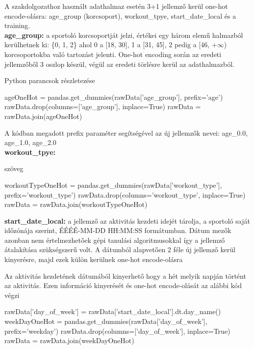 A szakdolgozathoz használt adathalmaz esetén 3+1 jellemző kerül one-hot encode-olásra: age\_group (korcsoport), workout\_tpye, start\_date\_local és a training.\\[6pt]

\textbf{age\_group:} a sportoló korcsoportját jelzi, értékei egy három elemű halmazból kerülhetnek ki: \{0, 1, 2\} ahol 0 a [18, 30], 1 a [31, 45], 2 pedig a [46, $+\infty$) korcsoportokba való tartozást jelenti. One-hot encoding során az eredeti jellemzőből 3 oszlop készül, végül az eredeti törlésre kerül az adathalmazból.
\begin{programreszlet}
Python parancsok részletezése
\begin{python}
ageOneHot = pandas.get_dummies(rawData['age_group'], prefix='age')
rawData.drop(columns=['age_group'], inplace=True)
rawData = rawData.join(ageOneHot)
\end{python}
\end{programreszlet}
A kódban megadott prefix paraméter segítségével az új jellemzők nevei: age\_0.0, age\_1.0, age\_2.0\\[6pt]


\textbf{workout\_tpye:} 

\begin{programreszlet}
	\TODO szöveg
\begin{python}
workoutTypeOneHot = pandas.get_dummies(rawData['workout_type'],
				       prefix='workout_type')
rawData.drop(columns='workout_type', inplace=True)
rawData = rawData.join(workoutTypeOneHot)
\end{python}
\end{programreszlet}


\textbf{start\_date\_local:} a jellemző az aktivitás kezdeti idejét tárolja, a sportoló saját időzónája szerint, ÉÉÉÉ-MM-DD HH:MM:SS formátumban. Dátum mezők azonban nem értelmezhetőek gépi tanulási algoritmusokkal így a jellemző átalakítása szükségszerű volt. A dátumból alapvetően 2 féle új jellemző kerül kinyerésre, majd ezek külön kerülnek one-hot encode-olásra

\begin{programreszlet}
Az aktivitás kezdetének dátumából kinyerhető hogy a hét melyik napján történt az aktivitás. Ezen információ kinyerését és one-hot encode-olását az alábbi kód végzi
\begin{python}
rawData['day_of_week'] = rawData['start_date_local'].dt.day_name()
weekDayOneHot = pandas.get_dummies(rawData['day_of_week'], 
				   prefix='weekday')
rawData.drop(columns=['day_of_week'], inplace=True)
rawData = rawData.join(weekDayOneHot)
\end{python}		
\end{programreszlet}

